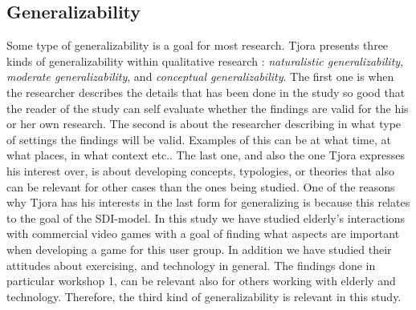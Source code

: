 \subsection{Generalizability}
Some type of generalizability is a goal for most research. Tjora presents three kinds of generalizability within qualitative research \cite{tjora}: \emph{naturalistic generalizability}, \emph{moderate generalizability}, and \emph{conceptual generalizability}. The first one is when the researcher describes the details that has been done in the study so good that the reader of the study can self evaluate whether the findings are valid for the his or her own research. The second is about the researcher describing in what type of settings the findings will be valid. Examples of this can be at what time, at what places, in what context etc.. The last one, and also the one Tjora expresses his interest over, is about developing concepts, typologies, or theories that also can be relevant for other cases than the ones being studied. One of the reasons why Tjora has his interests in the last form for generalizing is because this relates to the goal of the SDI-model. In this study we have studied elderly's interactions with commercial video games with a goal of finding what aspects are important when developing a game for this user group. In addition we have studied their attitudes about exercising, and technology in general. The findings done in particular workshop 1, can be relevant also for others working with elderly and technology. Therefore, the third kind of generalizability is relevant in this study.


